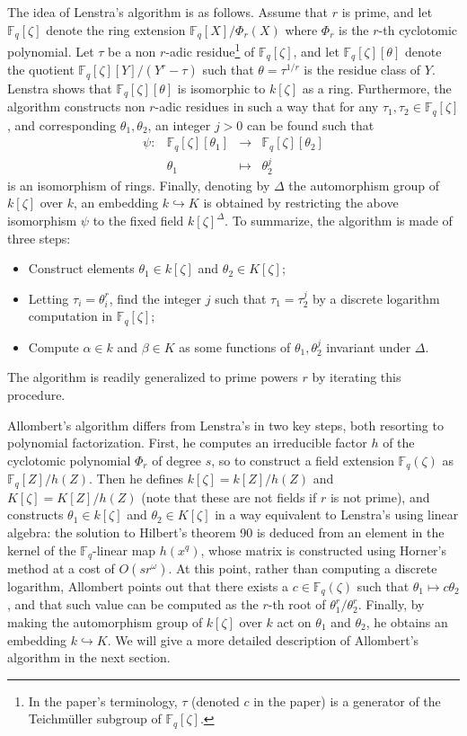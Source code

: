 \documentclass[12pt]{article}
\theoremstyle{plain}
\theoremstyle{definition}
\def\F{\ensuremath{\mathbb{F}}}
\newcounter{algorithm}
\begin{document}
The idea of Lenstra's algorithm is as follows.
Assume that $r$ is prime, and
let $\F_q[\zeta]$ denote the ring extension $\F_q[X] / \Phi_r(X)$ where $\Phi_r$ is the $r$-th 
cyclotomic polynomial. 
Let $\tau$ be a non $r$-adic residue\footnote{In the paper's terminology, $\tau$ (denoted $c$ in the paper) is a generator of the Teichm\"uller subgroup of $\F_q[\zeta]$.} of $\F_q[\zeta]$,
and let $\F_q[\zeta][\theta]$ denote the quotient $\F_q[\zeta][Y]/(Y^r - 
\tau)$ such that $\theta=\tau^{1/r}$ is the residue class of $Y$.
Lenstra shows that $\F_q[\zeta][\theta]$ is isomorphic to $k[\zeta]$ as a ring.
Furthermore, the algorithm constructs non $r$-adic residues in such a way that for any $\tau_1, \tau_2 \in \F_q[\zeta]$, 
and corresponding $\theta_1, \theta_2$,
an integer $j > 0$  can be found such that
\[
\begin{array}{lrll}
\psi: & \F_q[\zeta][\theta_1] & \rightarrow & \F_q[\zeta][\theta_2] \\
& \theta_1 & \mapsto & \theta_2^j
\end{array}
\]
is an isomorphism of rings.
Finally, denoting by $\Delta$ the automorphism group of $k[\zeta]$
over $k$, an embedding $k \hookrightarrow K$ is obtained by
restricting the above isomorphism $\psi$ to the fixed field
$k[\zeta]^\Delta$.
To summarize, the algorithm is made of three steps:
\begin{itemize}
\item Construct elements $\theta_1\in k[\zeta]$ and $\theta_2\in K[\zeta]$;
\item Letting $\tau_i=\theta_i^r$, find the integer $j$ such that
  $\tau_1=\tau_2^j$ by a discrete logarithm computation in
  $\F_q[\zeta]$;
\item Compute $\alpha\in k$ and $\beta\in K$ as some functions of
  $\theta_1,\theta_2^j$ invariant under $\Delta$.
\end{itemize}
The algorithm is readily generalized to prime powers $r$ by iterating
this procedure.

Allombert's algorithm differs from Lenstra's in two key steps, both
resorting to polynomial factorization.  First, he computes an
irreducible factor $h$ of the cyclotomic polynomial $\Phi_r$
of degree $s$, so to
construct a field extension $\F_q(\zeta)$ as $\F_q[Z]/h(Z)$.  Then he
defines $k[\zeta]=k[Z]/h(Z)$ and $K[\zeta]=K[Z]/h(Z)$ (note that these
are not fields if $r$ is not prime), and constructs
$\theta_1\in k[\zeta]$ and $\theta_2\in K[\zeta]$ in a way equivalent
to Lenstra's using linear algebra:
the solution to Hilbert's theorem 90 is deduced
from an element in the kernel of the $\F_q$-linear map $h(x^q)$,
whose matrix is constructed using
Horner's method at a cost of $O(s r^\omega)$.
At this point, rather than computing a discrete
logarithm, Allombert points out that there exists a $c\in\F_q(\zeta)$
such that $\theta_1\mapsto c\theta_2$, and that such value can be
computed as the $r$-th root of $\theta_1^r/\theta_2^r$.
Finally, by making the automorphism group of $k[\zeta]$ over $k$ act
on $\theta_1$ and $\theta_2$, he obtains an embedding $k \hookrightarrow K$.
We will give a more detailed description of Allombert's algorithm in the next section.
\end{document}
